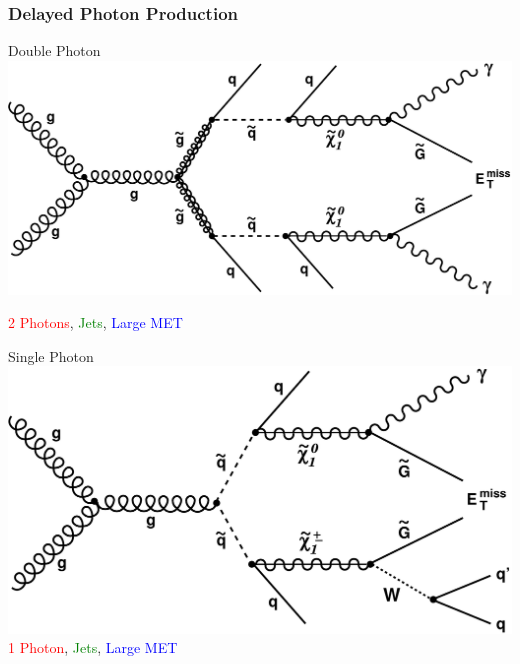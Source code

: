 \documentclass{beamer}
\begin{document}
\begin{frame}
\frametitle{Delayed Photon Production}   
  \fboxsep=0pt  
  \begin{varblock}[7cm]{Double Photon}
   \centering
    \includegraphics[width=0.50\linewidth]{THESISPLOTS/Diphoton_gluino.pdf}
       
     \large{ \textcolor{red}{2 Photons}, \textcolor{green}{Jets}, \textcolor{blue}{Large MET} }   
     \end{varblock}%
     \vspace{-0.3cm}
     \begin{varblock}[7cm]{Single Photon}
    \centering
       \includegraphics[width=0.50\linewidth]{THESISPLOTS/SinglePhoton_squark.pdf}
       \newline
       \large{ \textcolor{red}{1 Photon}, \textcolor{green}{Jets}, \textcolor{blue}{Large MET} }
    \end{varblock}
\end{frame}
\end{document}
